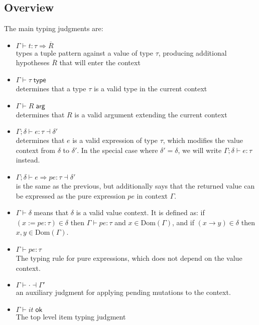 \documentclass[acmsmall,nonacm]{acmart}
\newcommand{\proves}{\vdash}
\newcommand{\makes}{\dashv}
\newcommand{\constep}{\proves\cdot\makes}
\begin{document}
\subsection{Overview}

The main typing judgments are:

\begin{itemize}
  \item $\Gamma \proves t:\tau \Rightarrow \overline{R}$\\ types a tuple pattern against a value of type $\tau$, producing additional hypotheses $\overline{R}$ that will enter the context
  \item $\Gamma \proves \tau\;\mathsf{type}$\\ determines that a type $\tau$ is a valid type in the current context
  \item $\Gamma \proves R\;\mathsf{arg}$\\ determines that $R$ is a valid argument extending the current context
  \item $\Gamma;\delta \proves e:\tau \makes\delta'$\\ determines that $e$ is a valid expression of type $\tau$, which modifies the value context from $\delta$ to $\delta'$. In the special case where $\delta'=\delta$, we will write $\Gamma;\delta \proves e:\tau$ instead.
  \item $\Gamma;\delta \proves e\Rightarrow pe:\tau \makes\delta'$\\ is the same as the previous, but additionally says that the returned value can be expressed as the pure expression $pe$ in context $\Gamma$.
  \item $\Gamma\proves \delta$ means that $\delta$ is a valid value context.
  It is defined as: if $(x:=pe:\tau)\in\delta$ then $\Gamma\proves pe:\tau$ and $x\in\mathrm{Dom}(\Gamma)$, and if $(x\to y)\in\delta$ then $x,y\in\mathrm{Dom}(\Gamma)$.
  \item $\Gamma \proves pe:\tau$\\ The typing rule for pure expressions, which does not depend on the value context.
  \item $\Gamma \constep \Gamma'$\\ an auxiliary judgment for applying pending mutations to the context.
  \item $\Gamma\proves it\;\mathsf{ok}$\\ The top level item typing judgment
\end{itemize}
\end{document}
